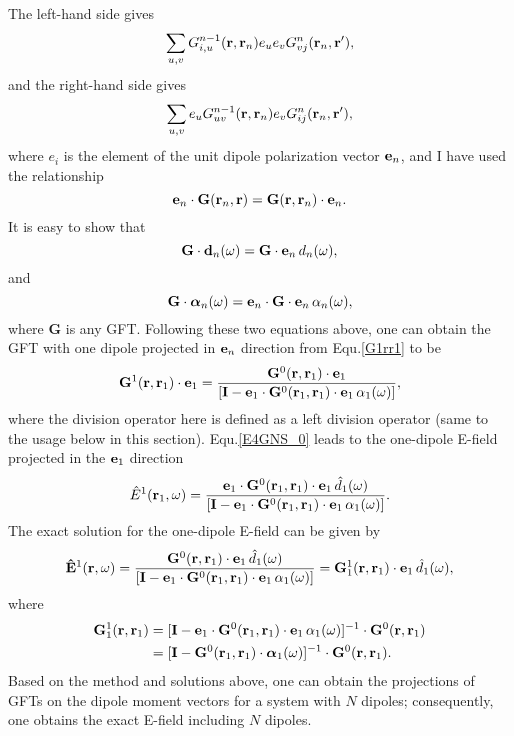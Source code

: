 The left-hand side gives
\begin{equation}
 \label{Gtensor_scalar_left}
\sum_{u,v}{{G^{n-1}_{i,u}(\mathbf{r},\mathbf{r}_n)e_u e_v G^n_{vj}(\mathbf{r}_n,\mathbf{r}')}},
\end{equation}
and the right-hand side gives
\begin{equation}
 \label{Gtensor_scalar_right}
\sum_{u,v}{e_u G^{n-1}_{uv}(\mathbf{r},\mathbf{r}_n)e_v G^n_{ij}(\mathbf{r}_n,\mathbf{r}')},
\end{equation}
where $e_i$ is the element of the unit dipole polarization vector $\mathbf{e}_n$, and I have used the relationship
\begin{equation}
 \mathbf{e}_n\cdot \mathbf{G}(\mathbf{r}_n,\mathbf{r})=\mathbf{G}(\mathbf{r},\mathbf{r}_n)\cdot \mathbf{e}_n.
\end{equation}
It is easy to show that
\begin{equation}
\mathbf{G}\cdot
{\bf d}_n(\omega)=\mathbf{G}\cdot
\mathbf{e}_n \, d_n(\omega),
\end{equation}
and
\begin{equation}
\mathbf{G}\cdot {\bm \alpha}_n(\omega)={\bf e}_n \cdot\mathbf{G}\cdot {\bf e}_n\,\alpha_n(\omega),
\end{equation}
where $\mathbf{G}$ is any GFT. Following these two equations above, one can obtain the GFT with one dipole projected in ${\bf e}_n$ direction from Equ.\eqref{G1rr1} to be
\begin{equation}
\mathbf{G}^1(\mathbf{r},\mathbf{r}_1)\cdot {\bf e}_1 =\frac{\mathbf{G}^0(\mathbf{r},\mathbf{r}_1)\cdot
\mathbf{e}_1 }{[\mathbf{I}-{\bf e}_1
\cdot\mathbf{G}^0(\mathbf{r}_1,\mathbf{r}_1)\cdot {\bf
e}_1\,\alpha_1(\omega)]},
\end{equation}
where the division operator here is defined as a left division operator (same to the usage below in this section).
Equ.\eqref{E4GNS_0} leads to the one-dipole E-field projected in the ${\bf e}_1$ direction
\begin{equation}
\hat{E}^1
(\mathbf{r}_1,\omega)=\frac{{\bf e}_1
\cdot\mathbf{G}^0(\mathbf{r}_1,\mathbf{r}_1)\cdot
\mathbf{e}_1 \, \hat{d}_1(\omega)}{[\mathbf{I}-{\bf e}_1
\cdot\mathbf{G}^0(\mathbf{r}_1,\mathbf{r}_1)\cdot {\bf e}_1
\, \alpha_1(\omega)]}.
\end{equation}
The exact solution for the one-dipole E-field can be given by~\cite{Yao2009a}
\begin{equation}
\mathbf{\hat{E}}^1(\mathbf{r},\omega)=\frac{\mathbf{G}^0(\mathbf{r},\mathbf{r}_1)\cdot
\mathbf{e}_1 \, \hat d_1(\omega)}{[\mathbf{I}-{\bf e}_1
\cdot\mathbf{G}^0(\mathbf{r}_1,\mathbf{r}_1)\cdot {\bf
e}_1\,\alpha_1(\omega)]}=\mathbf{G}^1_1(\mathbf{r},\mathbf{r}_1)\cdot
{\bf e}_1 \, \hat d_1(\omega),
\end{equation}
where
\begin{align}
\mathbf{G}^1_1(\mathbf{r},\mathbf{r}_1) &=[\mathbf{I}-{\bf e}_1
\cdot\mathbf{G}^0(\mathbf{r}_1,\mathbf{r}_1)\cdot {\bf
e}_1\,\alpha_1(\omega)]^{-1}\cdot {\mathbf{G}^0(\mathbf{r},\mathbf{r}_1) }\\
&=[\mathbf{I}-\mathbf{G}^0(\mathbf{r}_1,\mathbf{r}_1)\cdot {\bm \alpha}_1(\omega)]^{-1}\cdot{\mathbf{G}^0(\mathbf{r},\mathbf{r}_1) }.
\end{align}
Based on the method and solutions above, one can obtain the projections of GFTs on the dipole moment vectors for a system with $N$ dipoles;
consequently, one obtains the exact E-field including $N$ dipoles.

